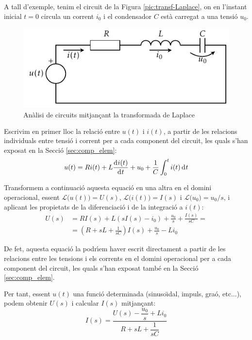 A tall d'exemple, tenim el circuit de la Figura
\vref{pic:transf-Laplace}, on en l'instant inicial $t=0$ circula un
corrent $i_0$ i el condensador $C$ est\`{a} carregat a una tensi\'{o} $u_0$.
\begin{figure}[h]
\centering
    \includegraphics{Imatges/Cap-Laplace-Circuit-RLC.pdf}
\caption{An\`{a}lisi de circuits mitjan\c{c}ant la transformada de Laplace}
\label{pic:transf-Laplace}
\end{figure}

Escrivim en primer lloc  la relaci\'{o} entre $u(t)$ i $i(t)$, a partir
de les relacions individuals entre tensi\'{o} i corrent per a cada
component del circuit, les quals s'han exposat en la Secci\'{o}
\vref{sec:comp_elem}:
\begin{equation}
    u(t) = R i(t) + L \frac{\diff i(t)}{\diff t} + u_0 + \frac{1}{C}
    \int_0^t i(t) \diff t
\end{equation}

Transformem a continuaci\'{o} aquesta equaci\'{o} en una altra en el domini
operacional, essent $\mathcal{L}\bigl(u(t)\bigr) = U(s)$,
$\mathcal{L}\bigl(i(t)\bigr) = I(s)$ i $\mathcal{L}\bigl(u_0\bigr) =
u_0/s$, i aplicant les propietats de la diferenciaci\'{o} i de la
integraci\'{o} a $i(t)$:
\begin{equation}\begin{split}
    U(s) &= R I(s) + L(s I(s) -i_0) + \frac{u_0}{s} + \frac{I(s)}{s
    C} =\\[1ex]
    &= \left( R + s L +\frac{1}{s C}\right)I(s) + \frac{u_0}{s} - L i_0
\end{split}\end{equation}

De fet, aquesta equaci\'{o} la podr\'{\i}em haver escrit directament a
partir de les relacions entre les tensions i els corrents en el
domini operacional per a cada  component del circuit, les quals
s'han exposat tamb\'{e} en la Secci\'{o} \vref{sec:comp_elem}.

Per tant, essent $u(t)$  una funci\'{o} determinada (sinuso\"{\i}dal, impuls,
gra\'{o}, etc...), podem obtenir $U(s)$ i calcular $I(s)$ mitjan\c{c}ant:
\begin{equation}
    I(s) = \frac{U(s)-\dfrac{u_0}{s} + L i_0}{R + s L
    +\dfrac{1}{s C}}\label{eq:i-Laplace}
\end{equation}

